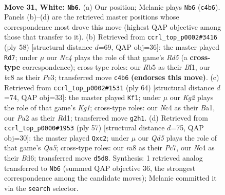 \documentclass[11pt]{article}
\begin{document}
\clearpage

\begin{figure}[p]\centering
\begin{subfigure}{0.46\textwidth}\centering
\resizebox{\linewidth}{!}{%
\newchessgame
\chessboard[
  setfen={r1b2k2/1p2q2p/2r5/1R1Q2p1/p1N1n3/4P1P1/P4PKP/B3R3 w - - 3 31},
  showmover=false,
  pgfstyle=straightmove, color=movearrow, markmove={c4-b6}
]}
\caption{}
\end{subfigure}\hfill
\begin{subfigure}{0.46\textwidth}\centering
\resizebox{\linewidth}{!}{%
\newchessgame
\chessboard[
  setfen={r6k/4q1p1/5p1p/3R4/1p1QbPn1/1P2P1P1/6NP/5BK1 w - - 3 30},
  showmover=false,
  pgfstyle=straightmove, color=movearrow, markmove={d5-d7}
]}
\caption{}
\end{subfigure}
\\[4pt]
\begin{subfigure}{0.46\textwidth}\centering
\resizebox{\linewidth}{!}{%
\newchessgame
\chessboard[
  setfen={6k1/1pb1qpp1/2r5/1Q6/P3p2p/3nP2P/3N1PP1/B2R2K1 w - - 0 33},
  showmover=false,
  pgfstyle=straightmove, color=movearrow, markmove={g1-f1}
]}
\caption{}
\end{subfigure}\hfill
\begin{subfigure}{0.46\textwidth}\centering
\resizebox{\linewidth}{!}{%
\newchessgame
\chessboard[
  setfen={r5k1/2p3p1/3b1pnp/3Pp3/q1N1P3/2R4P/2Q2PP1/2B3K1 b - - 3 29},
  showmover=false,
  pgfstyle=straightmove, color=movearrow, markmove={a4-c2}
]}
\caption{}
\end{subfigure}
\caption{\textbf{Move 31, White: \texttt{Nb6}.} (a) Our position; Melanie plays \texttt{Nb6} (\texttt{c4b6}). Panels (b)--(d) are the retrieved master positions whose correspondence most drove this move (highest QAP objective among those that transfer to it). (b) Retrieved from \texttt{ccrl\_top\_p0002\#3416} (ply 58) [structural distance $d$=69, QAP obj=36]: the master played \texttt{Rd7}; under $\mu$ our \emph{Nc4} plays the role of that game's \emph{Rd5} (a \textbf{cross-type} correspondence); cross-type roles: our \emph{R}b5 as their \emph{B}f1, our \emph{b}c8 as their \emph{P}e3; transferred move \texttt{c4b6} \textbf{(endorses this move)}. (c) Retrieved from \texttt{ccrl\_top\_p0002\#1531} (ply 64) [structural distance $d$=74, QAP obj=33]: the master played \texttt{Kf1}; under $\mu$ our \emph{Kg2} plays the role of that game's \emph{Kg1}; cross-type roles: our \emph{N}c4 as their \emph{B}a1, our \emph{P}a2 as their \emph{R}d1; transferred move \texttt{g2h1}. (d) Retrieved from \texttt{ccrl\_top\_p0000\#1953} (ply 57) [structural distance $d$=75, QAP obj=30]: the master played \texttt{Qxc2}; under $\mu$ our \emph{Qd5} plays the role of that game's \emph{Qa5}; cross-type roles: our \emph{r}a8 as their \emph{P}c7, our \emph{N}c4 as their \emph{B}d6; transferred move \texttt{d5d8}. Synthesis: 1 retrieved analog transferred to \texttt{Nb6} (summed QAP objective 36, the strongest correspondence among the candidate moves); Melanie committed it via the \texttt{search} selector.}
\label{fig:thought-m60}
\end{figure}
\end{document}
